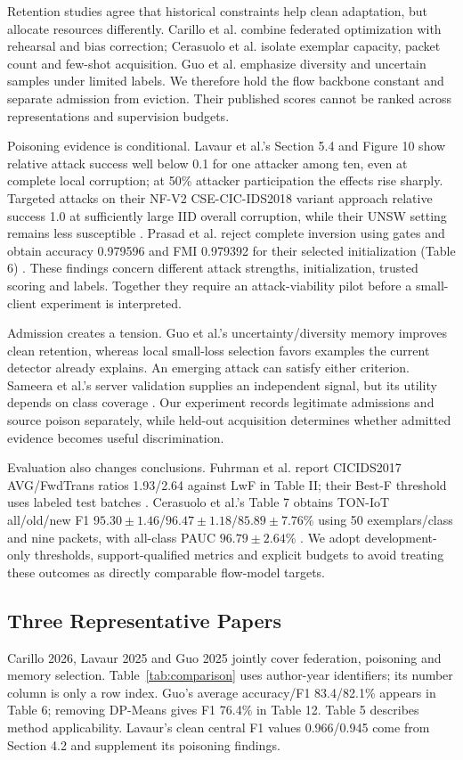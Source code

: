 \documentclass[10pt,a4paper]{article}
\begin{document}
Retention studies agree that historical constraints help clean adaptation, but allocate resources differently. Carillo et al. combine federated optimization with rehearsal and bias correction; Cerasuolo et al. isolate exemplar capacity, packet count and few-shot acquisition. Guo et al. emphasize diversity and uncertain samples under limited labels. We therefore hold the flow backbone constant and separate admission from eviction. Their published scores cannot be ranked across representations and supervision budgets.

Poisoning evidence is conditional. Lavaur et al.'s Section 5.4 and Figure 10 show relative attack success well below 0.1 for one attacker among ten, even at complete local corruption; at 50\% attacker participation the effects rise sharply. Targeted attacks on their NF-V2 CSE-CIC-IDS2018 variant approach relative success 1.0 at sufficiently large IID overall corruption, while their UNSW setting remains less susceptible \cite{lavaur}. Prasad et al. reject complete inversion using gates and obtain accuracy 0.979596 and FMI 0.979392 for their selected initialization (Table 6) \cite{ensemble}. These findings concern different attack strengths, initialization, trusted scoring and labels. Together they require an attack-viability pilot before a small-client experiment is interpreted.

Admission creates a tension. Guo et al.'s uncertainty/diversity memory improves clean retention, whereas local small-loss selection favors examples the current detector already explains. An emerging attack can satisfy either criterion. Sameera et al.'s server validation supplies an independent signal, but its utility depends on class coverage \cite{wei}. Our experiment records legitimate admissions and source poison separately, while held-out acquisition determines whether admitted evidence becomes useful discrimination.

Evaluation also changes conclusions. Fuhrman et al. report CICIDS2017 AVG/FwdTrans ratios 1.93/2.64 against LwF in Table II; their Best-F threshold uses labeled test batches \cite{cnd}. Cerasuolo et al.'s Table 7 obtains TON-IoT all/old/new F1 $95.30\pm1.46$/$96.47\pm1.18$/$85.89\pm7.76$\% using 50 exemplars/class and nine packets, with all-class PAUC $96.79\pm2.64$\% \cite{cerasuolo}. We adopt development-only thresholds, support-qualified metrics and explicit budgets to avoid treating these outcomes as directly comparable flow-model targets.

\subsection{Three Representative Papers}
Carillo 2026, Lavaur 2025 and Guo 2025 jointly cover federation, poisoning and memory selection. Table~\ref{tab:comparison} uses author-year identifiers; its number column is only a row index. Guo's average accuracy/F1 83.4/82.1\% appears in Table 6; removing DP-Means gives F1 76.4\% in Table 12. Table 5 describes method applicability. Lavaur's clean central F1 values 0.966/0.945 come from Section 4.2 and supplement its poisoning findings.
\end{document}
